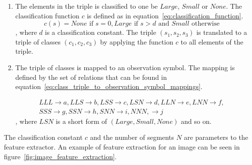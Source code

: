 \begin{enumerate}
\begin{enumerate}
    \item The elements in the triple is classified to one be $Large$, $Small$ or $None$. The classification function $c$ is defined as in equation~\ref{eq:classification_function}.
    \begin{equation}\label{eq:classification_function}
    c(s) = None \text{ if } s = 0, Large \text{ if } s > d \text{ and } Small \text{ otherwise}
    \end{equation}, where $d$ is a classification constant. The triple $(s_{1},s_{2},s_{3})$ is translated to a triple of classes $(c_{1},c_{2},c_{3})$ by applying the function $c$ to all elements of the triple.
    \item The triple of classes is mapped to an observation symbol. The mapping is defined by the set of relations that can be found in equation~\ref{eq:class_triple_to_observation_symbol_mappings}.

    \begin{equation}\label{eq:class_triple_to_observation_symbol_mappings}
     \substack{ LLL\rightarrow a,LLS\rightarrow b,LSS\rightarrow c,LSN\rightarrow d,LLN\rightarrow e,LNN\rightarrow f,\\
    SSS\rightarrow g,SSN\rightarrow h,SNN\rightarrow i,NNN,\rightarrow j }
    \end{equation}
    , where $LSN$ is a short form of $(Large,Small,None)$ and so on.
  \end{enumerate}  
\end{enumerate}

The classification constant $c$ and the number of segments $N$ are parameters to the feature extractor. An example of feature extraction for an image can be seen in figure~\ref{fig:image_feature_extraction}.

